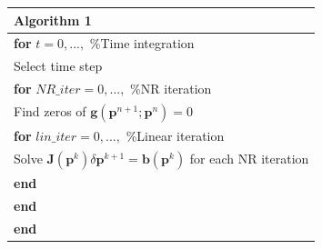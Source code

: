 \documentclass[12pt]{article}
\begin{document}
\begin{table}[!h]\centering
\begin{minipage}{1\textwidth}
\begin{tabular}{ |l| } 
\hline
\textbf{Algorithm 1}\\
\hline
\hline
\hspace{0.5cm}\textbf{for} $t=0,...,$    \hspace{52mm}    \%Time integration \\
\hspace{1cm} Select time step\\
\hspace{1cm}\textbf{for} $NR\_iter=0,...,$    \hspace{34mm}    \%NR iteration\\
 \hspace{1.5cm} Find zeros of $\mathbf{g}(\mathbf{p}^{n+1};\mathbf{p}^n)=0$\\
\hspace{1.5cm}\textbf{for} $lin\_iter=0,...,$    \hspace{31mm}    \%Linear iteration \\
\hspace{2cm}Solve $\mathbf{J}(\mathbf{p}^k)\delta \mathbf{p}^{k+1}=\mathbf{b}(\mathbf{p}^k)$ for each NR iteration\\
\hspace{1.5cm}\textbf{end}\\
\hspace{1cm}\textbf{end}\\
\hspace{0.5cm}\textbf{end}\\
\hline
\end{tabular}
\end{minipage}
\end{table}
\newpage
\end{document}

